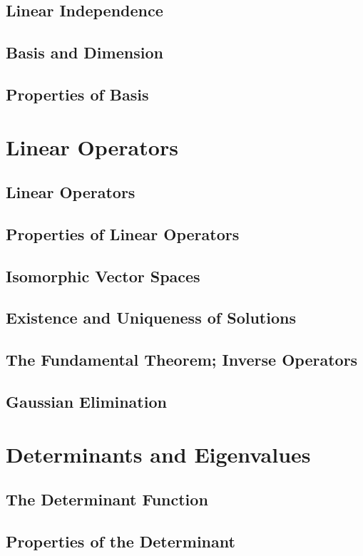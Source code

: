 \documentclass{book}
\theoremstyle{definition}
\theoremstyle{remark}
\begin{document}
\newpage
\subsection{Linear Independence}
\subsection{Basis and Dimension}
\subsection{Properties of Basis}

\newpage
\section{Linear Operators}
\subsection{Linear Operators}
\subsection{Properties of Linear Operators}
\subsection{Isomorphic Vector Spaces}
\subsection{Existence and Uniqueness of Solutions}
\subsection{The Fundamental Theorem; Inverse Operators}
\subsection{Gaussian Elimination}

\newpage
\section{Determinants and Eigenvalues}
\subsection{The Determinant Function}
\subsection{Properties of the Determinant}
\end{document}
